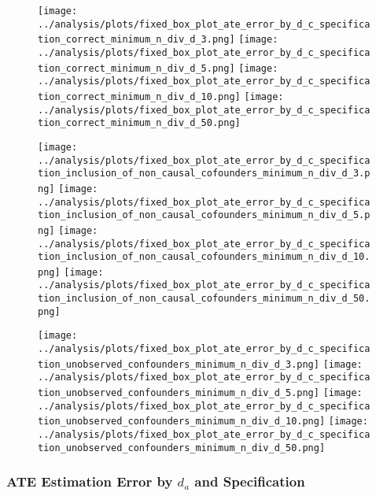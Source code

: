 \documentclass{article}
\numberwithin{equation}{section}
\begin{document}
\begin{figure}[H]
    \centering
    \texttt{[image: ../analysis/plots/fixed\_box\_plot\_ate\_error\_by\_d\_c\_specification\_correct\_minimum\_n\_div\_d\_3.png]}
    \texttt{[image: ../analysis/plots/fixed\_box\_plot\_ate\_error\_by\_d\_c\_specification\_correct\_minimum\_n\_div\_d\_5.png]}
    \texttt{[image: ../analysis/plots/fixed\_box\_plot\_ate\_error\_by\_d\_c\_specification\_correct\_minimum\_n\_div\_d\_10.png]}
    \texttt{[image: ../analysis/plots/fixed\_box\_plot\_ate\_error\_by\_d\_c\_specification\_correct\_minimum\_n\_div\_d\_50.png]}
\end{figure}
\begin{figure}[H]
    \centering
    \texttt{[image: ../analysis/plots/fixed\_box\_plot\_ate\_error\_by\_d\_c\_specification\_inclusion\_of\_non\_causal\_cofounders\_minimum\_n\_div\_d\_3.png]}
    \texttt{[image: ../analysis/plots/fixed\_box\_plot\_ate\_error\_by\_d\_c\_specification\_inclusion\_of\_non\_causal\_cofounders\_minimum\_n\_div\_d\_5.png]}
    \texttt{[image: ../analysis/plots/fixed\_box\_plot\_ate\_error\_by\_d\_c\_specification\_inclusion\_of\_non\_causal\_cofounders\_minimum\_n\_div\_d\_10.png]}
    \texttt{[image: ../analysis/plots/fixed\_box\_plot\_ate\_error\_by\_d\_c\_specification\_inclusion\_of\_non\_causal\_cofounders\_minimum\_n\_div\_d\_50.png]}
\end{figure}
\begin{figure}[H]
    \centering
    \texttt{[image: ../analysis/plots/fixed\_box\_plot\_ate\_error\_by\_d\_c\_specification\_unobserved\_confounders\_minimum\_n\_div\_d\_3.png]}
    \texttt{[image: ../analysis/plots/fixed\_box\_plot\_ate\_error\_by\_d\_c\_specification\_unobserved\_confounders\_minimum\_n\_div\_d\_5.png]}
    \texttt{[image: ../analysis/plots/fixed\_box\_plot\_ate\_error\_by\_d\_c\_specification\_unobserved\_confounders\_minimum\_n\_div\_d\_10.png]}
    \texttt{[image: ../analysis/plots/fixed\_box\_plot\_ate\_error\_by\_d\_c\_specification\_unobserved\_confounders\_minimum\_n\_div\_d\_50.png]}
\end{figure}

\subsubsection{ATE Estimation Error by $d_a$ and Specification}
\end{document}
